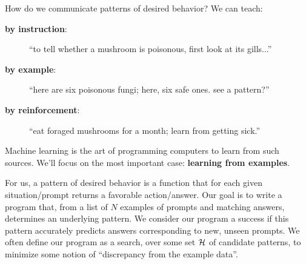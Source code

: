 
        How do we communicate patterns of desired behavior?  We can teach:
        \begin{description}
          \item[\textbf{by instruction}:  ]  ``to tell whether a mushroom is poisonous, first look at its gills...''
          \item[\textbf{by example}:      ]  ``here are six poisonous fungi; here, six safe ones.  see a pattern?''
          \item[\textbf{by reinforcement}:]  ``eat foraged mushrooms for a month; learn from getting sick.''
        \end{description}
        Machine learning is the art of programming computers to learn from such
        sources.  We'll focus on the most important case: \textbf{learning from
        examples}.\bcirc{}


        For us, a pattern of desired behavior is a function that for each given
        situation/prompt returns a favorable action/answer.
        Our goal is to write a program that, from a list of $N$ examples of
        prompts and matching answers, determines an underlying pattern.  We
        consider our program a success if this pattern accurately predicts
        answers corresponding to new, unseen prompts.
        We often define our program as a search, over some set $\mathcal{H}$ of
        candidate patterns, to minimize some notion of ``discrepancy from the
        example data''.


